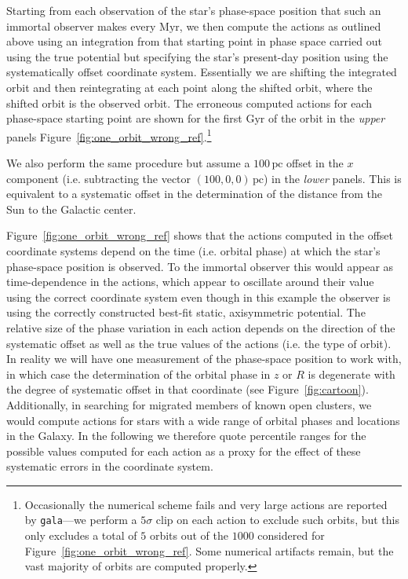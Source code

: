 \documentclass[twocolumn]{aastex62}
\newcommand{\pc}{\text{pc}}
\newcommand{\Myr}{\text{Myr}}
\newcommand{\Gyr}{\text{Gyr}}
\begin{document}
Starting from each observation of the star's phase-space position that such an
immortal observer makes every $\Myr$, we then compute the
actions as outlined above using an integration from that starting point in
phase space carried out using the true potential but specifying the star's
present-day position using the systematically offset coordinate system.
Essentially we are shifting the integrated orbit and then reintegrating at
each point along the shifted orbit, where the shifted orbit is the observed
orbit. The erroneous computed actions for each phase-space starting point are
shown for the first $\Gyr$ of the orbit in the {\em upper} panels
Figure~\ref{fig:one_orbit_wrong_ref}.\footnote{Occasionally the numerical
scheme fails and very large actions are reported by \texttt{gala}---we perform
a $5\sigma$ clip on each action to exclude such orbits, but this only excludes
a total of $5$ orbits out of the $1000$ considered for
Figure~\ref{fig:one_orbit_wrong_ref}. Some numerical artifacts remain, but the
vast majority of orbits are computed properly.}
    
We also perform the same procedure but assume a $100\,\pc$ offset in the $x$
component (i.e. subtracting the vector $(100, 0, 0)\,\pc$) in the {\em lower}
panels. This is equivalent to a systematic offset in the determination of the
distance from the Sun to the Galactic center.

Figure~\ref{fig:one_orbit_wrong_ref} shows that the actions computed in the
offset coordinate systems depend on the time (i.e. orbital phase) at which the
star's phase-space position is observed. To the immortal observer
this would appear as time-dependence in the actions, which appear to oscillate
around their value using the correct coordinate system even though in this
example the observer is using the correctly constructed best-fit static,
axisymmetric potential. The relative size of the phase variation in each
action depends on the direction of the systematic offset as well as the true
values of the actions (i.e. the type of orbit). In reality we will have one
measurement of the phase-space position to work with, in which case the
determination of the orbital phase in $z$ or $R$ is degenerate with the degree
of systematic offset in that coordinate (see Figure~\ref{fig:cartoon}).
Additionally, in searching for migrated members of known open clusters, we
would compute actions for stars with a wide range of orbital phases and
locations in the Galaxy. In the following we therefore quote percentile ranges
for the possible values computed for each action as a proxy for the effect of
these systematic errors in the coordinate system.
\end{document}
